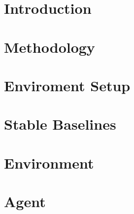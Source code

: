 \documentclass{report}
\begin{document}


\tableofcontents

\chapter{Introduction}\label{ch:intro}


\chapter{Methodology}\label{ch:methodology}


\chapter{Enviroment Setup}\label{ch:environment-setup}


\chapter{Stable Baselines}\label{ch:stable-baselines}


\chapter{Environment}\label{ch:environment}


\chapter{Agent}\label{ch:agent}


\printnoidxglossaries{}



\end{document}

